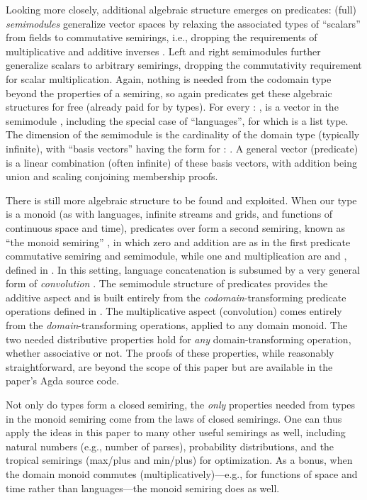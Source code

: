 \documentclass[acmsmall,screen,anonymous,timestamp]{acmart}
\begin{document}
Looking more closely, additional algebraic structure emerges on predicates: (full) \emph{semimodules} generalize vector spaces by relaxing the associated types of ``scalars'' from fields to commutative semirings, i.e., dropping the requirements of multiplicative and additive inverses \needcite{}.
Left and right semimodules further generalize scalars to arbitrary semirings, dropping the commutativity requirement for scalar multiplication.
Again, nothing is needed from the codomain type  beyond the properties of a semiring, so again predicates get these algebraic structures for free (already paid for by types).
For every { \AS :  },  is a vector in the semimodule { }, including the special case of ``languages'', for which  is a list type.
The dimension of the semimodule is the cardinality of the domain type  (typically infinite), with ``basis vectors'' having the form { } for { \AS : }.
A general vector (predicate) is a linear combination (often infinite) of these basis vectors, with addition being union and scaling conjoining membership proofs.

There is still more algebraic structure to be found and exploited.
When our  type  is a monoid (as with languages, infinite streams and grids, and functions of continuous space and time), predicates over  form a second semiring, known as ``the monoid semiring'' \needcite{}, in which zero and addition are as in the first predicate commutative semiring and semimodule, while one and multiplication are  and , defined in .
In this setting, language concatenation is subsumed by a very general form of \emph{convolution} \needcite{}.
The semimodule structure of predicates provides the additive aspect and is built entirely from the \emph{codomain}-transforming predicate operations defined in .
The multiplicative aspect (convolution) comes entirely from the \emph{domain}-transforming operations, applied to any domain monoid.
The two needed distributive properties hold for \emph{any} domain-transforming operation, whether associative or not.
The proofs of these properties, while reasonably straightforward, are beyond the scope of this paper but are available in the paper's Agda source code.

Not only do types form a closed semiring, the \emph{only} properties needed from types in the monoid semiring come from the laws of closed semirings.
One can thus apply the ideas in this paper to many other useful semirings as well, including natural numbers (e.g., number of parses), probability distributions, and the tropical semirings (max/plus and min/plus) for optimization.
As a bonus, when the domain monoid commutes (multiplicatively)---e.g., for functions of space and time rather than languages---the monoid semiring does as well.
\end{document}

